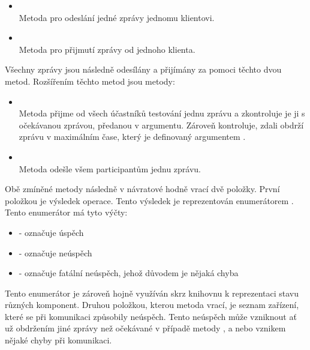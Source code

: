 \begin{itemize}
    \item {} \\
    Metoda pro odeslání jedné zprávy jednomu klientovi.
    \item {} \\
    Metoda pro přijmutí zprávy od jednoho klienta.
\end{itemize}

Všechny zprávy jsou následně odesílány a přijímány za pomoci těchto dvou metod. Rozšířením těchto metod jsou metody:

 {
    \setlength{\emergencystretch}{3em} 
    \begin{itemize}
        \item {} \\
        Metoda přijme od všech účastníků testování jednu zprávu a zkontroluje je ji s očekávanou zprávou, předanou v argumentu. Zároveň kontroluje, zdali obdrží zprávu v maximálním čase, který je definovaný argumentem . 
        \item {} \\
        Metoda odešle všem participantům jednu zprávu.
    \end{itemize}
 }

Obě zmíněné metody následně v návratové hodně vrací dvě položky. První položkou je výsledek operace. Tento výsledek je reprezentován enumerátorem . Tento enumerátor má tyto výčty:

\begin{itemize}
    \item {} - označuje úspěch
    \item {} - označuje neúspěch
    \item {} - označuje fatální neúspěch, jehož důvodem je nějaká chyba
\end{itemize}

Tento enumerátor je zároveň hojně využíván skrz knihovnu k reprezentaci stavu různých komponent. Druhou položkou, kterou metoda vrací, je seznam zařízení, které se při komunikaci způsobily neúspěch. Tento neúspěch může vzniknout ať už obdržením jiné zprávy než očekávané v případě metody , a nebo vznikem nějaké chyby při komunikaci.

